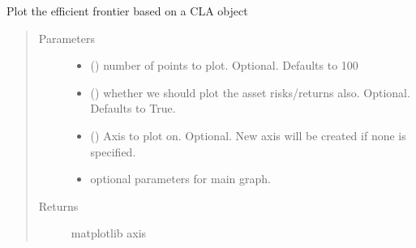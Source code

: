 \documentclass[letterpaper,10pt,english]{sphinxmanual}
\begin{document}
\begin{fulllineitems}
\label{\detokenize{dalio.util:dalio.util.plotting_utils.plot_efficient_frontier}}
Plot the efficient frontier based on a CLA object
\begin{quote}\begin{description}
\item[{Parameters}] \leavevmode\begin{itemize}
\item {} 
 () \textendash{} number of points to plot. Optional. Defaults to 100

\item {} 
 () \textendash{} whether we should plot the asset risks/returns
also. Optional. Defaults to True.

\item {} 
 (\sphinxstyleliteralemphasis{\sphinxupquote{, }}) \textendash{} Axis to plot on. Optional. New axis will
be created if none is specified.

\item {} 
 \textendash{} optional parameters for main graph.

\end{itemize}

\item[{Returns}] \leavevmode
matplotlib axis

\end{description}\end{quote}

\end{fulllineitems}

\end{document}
